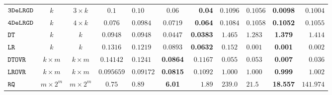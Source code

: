 {\begin {table}[t]
\begin{center}
{\begin{tabular}{|| >{\tiny}l || c | c || c | l | c | r || c | l | c | r || }
         \hhline{||-||---||-||--||----||}
         $  \mathtt{ 3DeLRGD }$ & $ k $ & $  3\times k $ & $0.1$  & $0.10$ & $0.06$ & \textbf{0.04} & $0.1096$   & $0.1056$ & \textbf{0.0098} & $0.1004$  \\
         \hhline{||-||---||-||--||----||}
         $  \mathtt{ 4DeLRGD }$ & $ k $ & $  4\times k $  & $0.076$  & $0.0984$ & $0.0719$ & \textbf{0.064}  & $0.1084$   & $0.1058$ & \textbf{0.1052} & $0.1055$   \\
         \hhline{||-||---||-||--||----||}
        $\mathtt{DT}$ & $k$ &  $k$ & $0.0948$  & $0.0948$ & $0.0447$ & \textbf{0.0383} & $ 1.465$  & $ 1.283$ & \textbf{1.379 } & {$1.414$}   \\
         \hhline{||-||---||-||--||----||}
         $\mathtt{LR}$ & $k$ &  $k$ & $0.1316$  & $0.1219$ & $ 0.0893$ & \textbf{0.0632} & $ 0.152$  &  $ 0.001$ & {\textbf{0.001}} & {$0.002$}   \\
         \hhline{||-||---||-||--||----||}
        $\mathtt{DTOVR}$ & $k \times m$ &  $ k \times m $  & $0.14142$  & $0.1241$ & \textbf{0.0864} & $ 0.1167$ &  $0.055$ & $0.053$  &  {\textbf{0.007}} & $0.036$  \\
        \hhline{||-||---||-||--||----||}
        $\mathtt{LROVR}$  & $k \times m$ &  $ k \times m $  & $0.095659$  & $0.09172$ & \textbf{0.0815} & $0.1092$  &  $ 1.000  $  &  $ 1.000 $ & {\textbf{ 0.999}} & $ 1.002 $  \\
        \hhline{||-||---||-||--||----||}
        $\mathtt{RQ}$~\cite{Jamieson2015TheAO} & $ m \times 2^m $ & $  m \times 2^m $  & $0.75$  & $0.89$ & \textbf{6.01} & $1.89$ & $239.0$   & $21.5$ & {\textbf{18.557}} & $141.974$   \\

\end{tabular}}
\end{center}
\end{table}}
